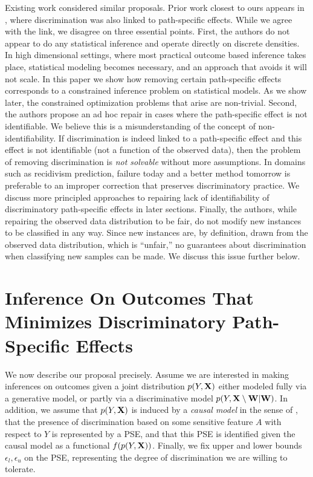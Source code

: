 \documentclass[letterpaper]{article} %
\newcommand{\citep}{\cite}
\begin{document}
Existing work considered similar proposals.  Prior work closest to ours appears in \citep{Zhang17causal}, where discrimination was also linked to path-specific effects.  While we agree with the link, we disagree on three essential points.  First, the authors do not appear to do any statistical inference and operate directly on discrete densities.  In high dimensional settings, where most practical outcome based inference takes place, statistical modeling becomes necessary, and an approach that avoids it will not scale.
In this paper we show how removing certain path-specific effects corresponds to a constrained inference problem on statistical models.  As we show later, the constrained optimization problems that arise are non-trivial.  Second, the authors propose an ad hoc repair in cases where the path-specific effect is not identifiable.  We believe this is a misunderstanding of the concept of non-identifiability.  If discrimination is indeed linked to a path-specific effect and this effect is not identifiable (not a function of the observed data), then the problem of removing discrimination is \emph{not solvable} without more assumptions.  In domains such as recidivism prediction, failure today and a better method tomorrow is preferable to an improper correction that preserves discriminatory practice.  We discuss more principled approaches to repairing lack of identifiability of discriminatory path-specific effects in later sections.  Finally, the authors, while repairing the observed data distribution to be fair, do not modify new instances to be classified in any way.  Since new instances are, by definition, drawn from the observed data distribution, which is ``unfair,'' no guarantees about discrimination when classifying new samples can be made.  We discuss this issue further below.

\section{Inference On Outcomes That Minimizes Discriminatory Path-Specific Effects}
\label{sec:inference}

We now describe our proposal precisely.  Assume we are interested in making inferences on outcomes given a joint distribution $p(Y,{\bf X})$ either modeled fully via a generative model, or partly via a discriminative model $p(Y,{\bf X}\setminus{\bf W}|{\bf W})$.
In addition, we assume
that $p(Y,{\bf X})$ is induced by a \emph{causal model} in the sense of \citep{pearl09causality,spirtes01causation},
that the presence of discrimination based on some sensitive feature $A$ with respect to $Y$ is represented by a PSE, and that this PSE is identified given the causal model as a functional $f(p(Y,{\bf X}))$.  Finally, we fix upper and lower bounds $\epsilon_l,\epsilon_u$ on the PSE, representing the degree of discrimination we are willing to tolerate.
\end{document}
